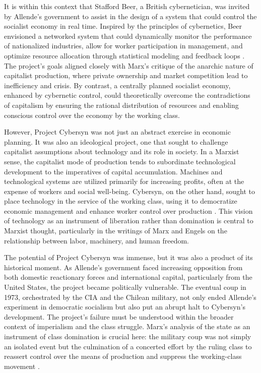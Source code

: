 \begin{refsection}
It is within this context that Stafford Beer, a British cybernetician, was invited by Allende's government to assist in the design of a system that could control the socialist economy in real time. Inspired by the principles of cybernetics, Beer envisioned a networked system that could dynamically monitor the performance of nationalized industries, allow for worker participation in management, and optimize resource allocation through statistical modeling and feedback loops \cite[pp.~120-125]{beer1994}. The project's goals aligned closely with Marx's critique of the anarchic nature of capitalist production, where private ownership and market competition lead to inefficiency and crisis. By contrast, a centrally planned socialist economy, enhanced by cybernetic control, could theoretically overcome the contradictions of capitalism by ensuring the rational distribution of resources and enabling conscious control over the economy by the working class.

However, Project Cybersyn was not just an abstract exercise in economic planning. It was also an ideological project, one that sought to challenge capitalist assumptions about technology and its role in society. In a Marxist sense, the capitalist mode of production tends to subordinate technological development to the imperatives of capital accumulation. Machines and technological systems are utilized primarily for increasing profits, often at the expense of workers and social well-being. Cybersyn, on the other hand, sought to place technology in the service of the working class, using it to democratize economic management and enhance worker control over production \cite[pp.~576-579]{medina2011}. This vision of technology as an instrument of liberation rather than domination is central to Marxist thought, particularly in the writings of Marx and Engels on the relationship between labor, machinery, and human freedom.

The potential of Project Cybersyn was immense, but it was also a product of its historical moment. As Allende's government faced increasing opposition from both domestic reactionary forces and international capital, particularly from the United States, the project became politically vulnerable. The eventual coup in 1973, orchestrated by the CIA and the Chilean military, not only ended Allende's experiment in democratic socialism but also put an abrupt halt to Cybersyn's development. The project's failure must be understood within the broader context of imperialism and the class struggle. Marx's analysis of the state as an instrument of class domination is crucial here: the military coup was not simply an isolated event but the culmination of a concerted effort by the ruling class to reassert control over the means of production and suppress the working-class movement \cite[pp.~67-72]{engels1880}.


\end{refsection}

